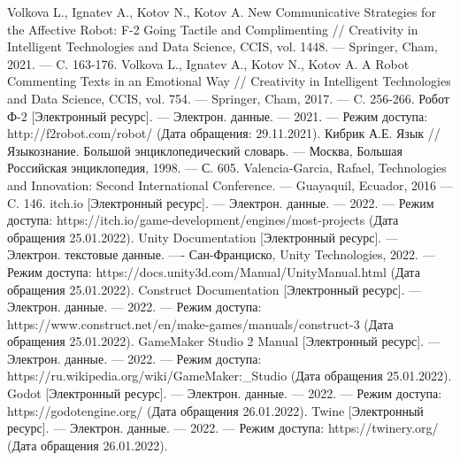 
%
%

\renewcommand\bibname{Список использованных источников}
\begin{thebibliography}{3}

Volkova L., Ignatev A., Kotov N., Kotov A. New Communicative Strategies for the Affective Robot: F-2 Going Tactile and Complimenting // Creativity in Intelligent Technologies and Data Science, CCIS, vol. 1448. --- Springer, Cham, 2021. --- C. 163-176.
Volkova L., Ignatev A., Kotov N., Kotov A. A Robot Commenting Texts in an Emotional Way // Creativity in Intelligent Technologies and Data Science, CCIS, vol. 754. --- Springer, Cham, 2017. --- C. 256-266.
Робот Ф-2 [Электронный ресурс]. --- Электрон. данные. --- 2021. --- Режим доступа: http://f2robot.com/robot/ (Дата обращения: 29.11.2021).
Кибрик А.Е. Язык // Языкознание. Большой энциклопедический словарь. --- Москва, Большая Российская энциклопедия, 1998. --- С. 605.
Valencia-Garcia, Rafael, Technologies and Innovation: Second International Conference. --- Guayaquil, Ecuador, 2016 --- C. 146.
itch.io [Электронный ресурс]. --- Электрон. данные. --- 2022. --- Режим доступа: https://itch.io/game-development/engines/most-projects (Дата обращения 25.01.2022).
Unity Documentation [Электронный ресурс]. --- Электрон. текстовые данные. ---- Сан-Франциско, Unity Technologies, 2022. --- Режим доступа: https://docs.unity3d.com/Manual/UnityManual.html (Дата обращения 25.01.2022).
Construct Documentation [Электронный ресурс]. --- Электрон. данные. --- 2022. --- Режим доступа: https://www.construct.net/en/make-games/manuals/construct-3 (Дата обращения 25.01.2022).
GameMaker Studio 2 Manual [Электронный ресурс]. --- Электрон. данные. --- 2022. --- Режим доступа: https://ru.wikipedia.org/wiki/GameMaker:\_Studio (Дата обращения 25.01.2022).
Godot [Электронный ресурс]. --- Электрон. данные. --- 2022. --- Режим доступа: https://godotengine.org/ (Дата обращения 26.01.2022).
Twine [Электронный ресурс]. --- Электрон. данные. --- 2022. --- Режим доступа: https://twinery.org/ (Дата обращения 26.01.2022).

\end{thebibliography}
